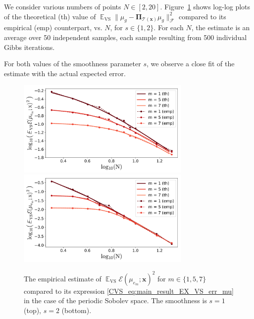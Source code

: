 \documentclass[twoside,11pt]{book}
\numberwithin{theorem}{chapter}
\numberwithin{definition}{chapter}
\numberwithin{proposition}{chapter}
\numberwithin{corollary}{chapter}
\numberwithin{example}{chapter}
\numberwithin{lemma}{chapter}
\numberwithin{assumption}{chapter}
\numberwithin{equation}{chapter}
\numberwithin{figure}{chapter}
\DeclareMathOperator{\VS}{\mathrm{VS}}
\DeclareMathOperator{\EX}{\mathbb{E}}
\newcommand{\rb}[1]{\textcolor{magenta}{#1}}
\begin{document}
  We consider various numbers of points $N \in [2,20]$. Figure~\ref{CVS_fig:simulation_one} shows log-log plots of the theoretical (th) value of $\EX_{\VS} \|\mu_{g} - \bm{\Pi}_{\mathcal{T}(\bm{x})} \mu_{g}\|_{\mathcal{F}}^{2}$ compared to its empirical (emp) counterpart, vs. $N$, for $s \in \{1,2\}$. For each $N$, the estimate is an average over 50 independent samples, each sample resulting from 500 individual Gibbs iterations.



 For both values of the smoothness parameter $s$, we observe a close fit of the estimate with the actual expected error.

\begin{figure}[]
    \centering
\includegraphics[width= 0.75\textwidth]{img/icml/simulation/EX_VS_err_n_s_1_th_vs_emp_exp50_2.pdf}\\
\includegraphics[width= 0.75\textwidth]{img/icml/simulation/EX_VS_err_n_s_2_th_vs_emp_exp50.pdf}

\caption{\label{CVS_fig:simulation_one} The empirical estimate of $\EX_{\VS} \mathcal{E}(\mu_{e_{m}};\bm{x})^{2}$ for $m \in \{1,5,7\}$ compared to its expression \eqref{CVS_eq:main_result_EX_VS_err_mu} in the case of the periodic Sobolev space. The smoothness is $s=1$ (top), $s=2$ (bottom).}
\end{figure}
\end{document}
